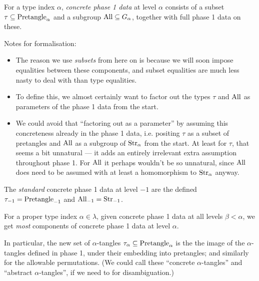 \begin{definition}
  \label{def:concrete-phase-1-data}
  For a type index $\alpha$, \emph{concrete phase 1 data} at level $\alpha$ consists of a subset $\tau \subseteq \mathrm{Pretangle}_\alpha$ and a subgroup $\mathrm{All} \subseteq G_\alpha$, together with full phase 1 data on these.

  Notes for formalisation:
  \begin{itemize}
    \item The reason we use \emph{subsets} from here on is because we will soon impose equalities between these components, and subset equalities are much less nasty to deal with than type equalities.
    \item To define this, we almost certainly want to factor out the types $\tau$ and $\mathrm{All}$ as parameters of the phase 1 data from the start.
    \item We could avoid that “factoring out as a parameter” by assuming this concreteness already in the phase 1 data, i.e. positing $\tau$ as a subset of pretangles and $\mathrm{All}$ as a subgroup of $\mathrm{Str}_\alpha$ from the start.  At least for $\tau$, that seems a bit unnatural — it adds an entirely irrelevant extra assumption throughout phase 1.  For $\mathrm{All}$ it perhaps wouldn’t be so unnatural, since $\mathrm{All}$ does need to be assumed with at least a homomorphism to $\mathrm{Str}_\alpha$ anyway.
  \end{itemize}

  The \emph{standard} concrete phase 1 data at level $-1$ are the defined $\tau_{-1} = \mathrm{Pretangle}_{-1}$ and $\mathrm{All}_{-1} = \mathrm{Str}_{-1}$.
\end{definition}

\begin{definition}
  \label{def:concrete-phase-1-data-propagates}
  For a proper type index $\alpha \in \lambda$, given concrete phase 1 data at all levels $\beta < \alpha$, we get \emph{most} components of concrete phase 1 data at level $\alpha$.

  In particular, the new set of $\alpha$-tangles $\tau_\alpha \subseteq \mathrm{Pretangle}_\alpha$ is the the image of the $\alpha$-tangles defined in phase 1, under their embedding into pretangles; and similarly for the allowable permutations.  (We could call these “concrete $\alpha$-tangles” and “abstract $\alpha$-tangles”, if we need to for disambiguation.)
\end{definition}

